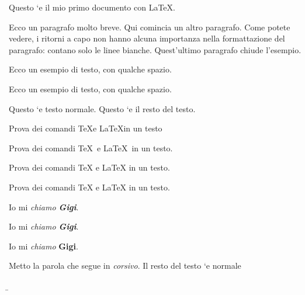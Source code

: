 \documentclass[a4paper,11pt]{article}
\begin{document}
Questo `e il mio primo documento con \LaTeX.

Ecco un paragrafo molto breve.
Qui comincia un altro paragrafo. Come potete vedere,
i ritorni a capo non hanno alcuna importanza nella
formattazione del paragrafo: contano solo le linee bianche.
Quest'ultimo paragrafo chiude l'esempio.

Ecco un esempio di testo, con qualche spazio.

Ecco un esempio
di testo, con
qualche spazio.

Questo `e testo normale. %
Questo `e il resto del testo.

Prova dei comandi \TeX e \LaTeX in un testo

Prova dei comandi \TeX\ e \LaTeX\ in un testo.

Prova dei comandi \TeX{} e \LaTeX{} in un testo.

Prova dei comandi {\TeX} e {\LaTeX} in un testo.

Io mi {\itshape chiamo {\bfseries Gigi}}.

Io mi {\itshape chiamo \bfseries Gigi}.

Io mi {\itshape chiamo} {\bfseries Gigi}.

Metto la parola che segue in \textit{corsivo}.
Il resto del testo `e normale

\b
\end{document}

